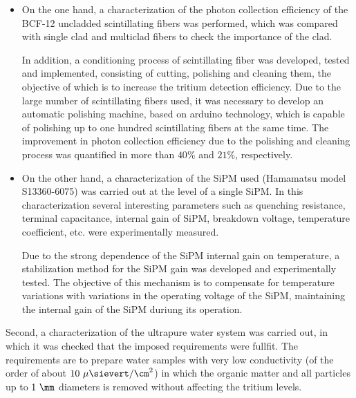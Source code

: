 \begin{itemize}

\item{} On the one hand, a characterization of the photon collection efficiency of the BCF-12 uncladded scintillating fibers was performed, which was compared with single clad and multiclad fibers to check the importance of the clad. 

In addition, a conditioning process of scintillating fiber was developed, tested and implemented, consisting of cutting, polishing and cleaning them, the objective of which is to increase the tritium detection efficiency. Due to the large number of scintillating fibers used, it was necessary to develop an automatic polishing machine, based on arduino technology, which is capable of polishing up to one hundred scintillating fibers at the same time. The improvement in photon collection efficiency due to the polishing and cleaning process was quantified in more than $40\%$ and $21\%$, respectively. 

\item{} On the other hand, a characterization of the SiPM used (Hamamatsu model S13360-6075) was carried out at the level of a single SiPM. In this characterization several interesting parameters such as quenching resistance, terminal capacitance, internal gain of SiPM, breakdown voltage, temperature coefficient, etc. were experimentally measured. %

Due to the strong dependence of the SiPM internal gain on temperature, a stabilization method for the SiPM gain was developed and experimentally tested. The objective of this mechanism is to compensate for temperature variations with variations in the operating voltage of the SiPM, maintaining the internal gain of the SiPM duriung its operation.

\end{itemize}

Second, a characterization of the ultrapure water system was carried out, in which it was checked that the imposed requirements were fullfit. The requirements are to prepare water samples with very low conductivity (of the order of about $10~\mu\sievert/\cm^2$) in which the organic matter and all particles up to $1~\mm$ diameters is removed without affecting the tritium levels.

